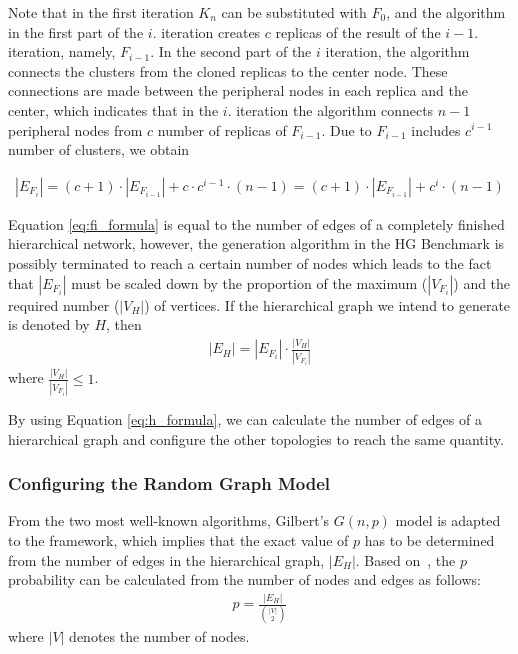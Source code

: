 Note that in the first iteration $K_n$ can be substituted with $F_0$, and the algorithm in the first part of the $i.$ iteration creates $c$ replicas of the result of the $i-1.$ iteration, namely, $F_{i-1}$. In the second part of the $i$ iteration, the algorithm connects the clusters from the cloned replicas to the center node. These connections are made between the peripheral nodes in each replica and the center, which indicates that in the $i.$ iteration the algorithm connects $n-1$ peripheral nodes from $c$ number of replicas of $F_{i-1}$. Due to $F_{i-1}$ includes $c^{i-1}$ number of clusters, we obtain

\begin{align}\label{eq:fi_formula}
	|E_{F_i}| = (c+1) \cdot |E_{F_{i-1}}| + c \cdot c^{i-1} \cdot (n - 1)	= (c+1) \cdot |E_{F_{i-1}}| + c^i \cdot (n - 1)
\end{align}

Equation \ref{eq:fi_formula} is equal to the number of edges of a completely finished hierarchical network, however, the generation algorithm in the HG Benchmark is possibly terminated to reach a certain number of nodes which leads to the fact that $|E_{F_i}|$ must be scaled down by the proportion of the maximum ($|V_{F_i}|$) and the required number ($|V_H|$) of vertices. If the hierarchical graph we intend to generate is denoted by $H$, then
\begin{align}\label{eq:h_formula}
	|E_H| = |E_{F_i}| \cdot \frac{|V_H|}{|V_{F_i}|}
\end{align}
where $\frac{|V_H|}{|V_{F_i}|} \leq 1$.

By using Equation \ref{eq:h_formula}, we can calculate the number of edges of a hierarchical graph and configure the other topologies to reach the same quantity.

\subsubsection{Configuring the Random Graph Model}
From the two most well-known algorithms, Gilbert's $G(n,p)$ model is adapted to the framework, which implies that the exact value of $p$ has to be determined from the number of edges in the hierarchical graph, $|E_H|$. Based on~\cite{random_p}, the $p$ probability can be calculated from the number of nodes and edges as follows:
\begin{align}
	p = \frac{|E_H|}{\binom{|V|}{2}}
\end{align}
where $|V|$ denotes the number of nodes.

